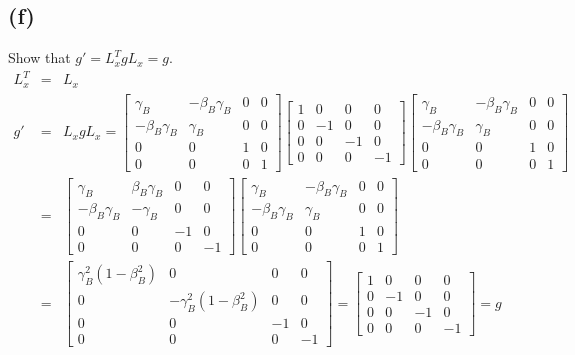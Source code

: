 \documentclass[11pt]{amsart}
\begin{document}
\subsection*{(f)} Show that $g'=L_{x}^{T}gL_{x}=g$. \\
\begin{eqnarray*} 
L_{x}^{T} &=& L_{x} \\
g' &=& L_{x}gL_{x} = \begin{bmatrix}
	\gamma_{B} & -\beta_{B}\gamma_{B} & 0 & 0 \\
	-\beta_{B}\gamma_{B} & \gamma_{B} & 0 & 0 \\
	0 & 0 & 1 & 0 \\
	0 & 0 & 0 & 1 
	\end{bmatrix}\begin{bmatrix}
	1 & 0 & 0 & 0 \\
	0 & -1 & 0 & 0 \\
	0 & 0 & -1 & 0 \\
	0 & 0 & 0 & -1 
	\end{bmatrix}\begin{bmatrix}
	\gamma_{B} & -\beta_{B}\gamma_{B} & 0 & 0 \\
	-\beta_{B}\gamma_{B} & \gamma_{B} & 0 & 0 \\
	0 & 0 & 1 & 0 \\
	0 & 0 & 0 & 1 
	\end{bmatrix} \\
&=&  \begin{bmatrix}
	\gamma_{B} & \beta_{B}\gamma_{B} & 0 & 0 \\
	-\beta_{B}\gamma_{B} & -\gamma_{B} & 0 & 0 \\
	0 & 0 & -1 & 0 \\
	0 & 0 & 0 & -1 
	\end{bmatrix}\begin{bmatrix}
	\gamma_{B} & -\beta_{B}\gamma_{B} & 0 & 0 \\
	-\beta_{B}\gamma_{B} & \gamma_{B} & 0 & 0 \\
	0 & 0 & 1 & 0 \\
	0 & 0 & 0 & 1 
	\end{bmatrix} \\
&=& \begin{bmatrix}
	\gamma_{B}^{2}(1-\beta_{B}^{2}) & 0 & 0 & 0 \\
	0 & -\gamma_{B}^{2}(1-\beta_{B}^{2}) & 0 & 0 \\
	0 & 0 & -1 & 0 \\
	0 & 0 & 0 & -1 
	\end{bmatrix} = \begin{bmatrix}
	1 & 0 & 0 & 0 \\
	0 & -1 & 0 & 0 \\
	0 & 0 & -1 & 0 \\
	0 & 0 & 0 & -1
	\end{bmatrix} = g 
\end{eqnarray*} \\
\end{document}
